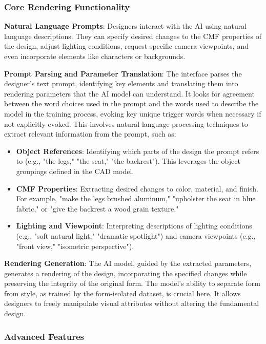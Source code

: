 \documentclass[12pt]{report}
\begin{document}
\subsubsection{Core Rendering Functionality}

\textbf{Natural Language Prompts}: Designers interact with the AI using natural language descriptions. They can specify desired changes to the CMF properties of the design, adjust lighting conditions, request specific camera viewpoints, and even incorporate elements like characters or backgrounds. 

\textbf{Prompt Parsing and Parameter Translation}: The interface parses the designer's text prompt, identifying key elements and translating them into rendering parameters that the AI model can understand. It looks for agreement between the word choices used in the prompt and the words used to describe the model in the training process, evoking key unique trigger words when necessary if not explicitly evoked. This involves natural language processing techniques to extract relevant information from the prompt, such as:

\begin{itemize}
\item \textbf{Object References}: Identifying which parts of the design the prompt refers to (e.g., "the legs," "the seat," "the backrest"). This leverages the object groupings defined in the CAD model.
\item \textbf{CMF Properties}: Extracting desired changes to color, material, and finish. For example, "make the legs brushed aluminum," "upholster the seat in blue fabric," or "give the backrest a wood grain texture."
\item \textbf{Lighting and Viewpoint}: Interpreting descriptions of lighting conditions (e.g., "soft natural light," "dramatic spotlight") and camera viewpoints (e.g., "front view," "isometric perspective").
\end{itemize}

\textbf{Rendering Generation}: The AI model, guided by the extracted parameters, generates a rendering of the design, incorporating the specified changes while preserving the integrity of the original form. The model's ability to separate form from style, as trained by the form-isolated dataset, is crucial here. It allows designers to freely manipulate visual attributes without altering the fundamental design.

\subsubsection{Advanced Features}
\end{document}
